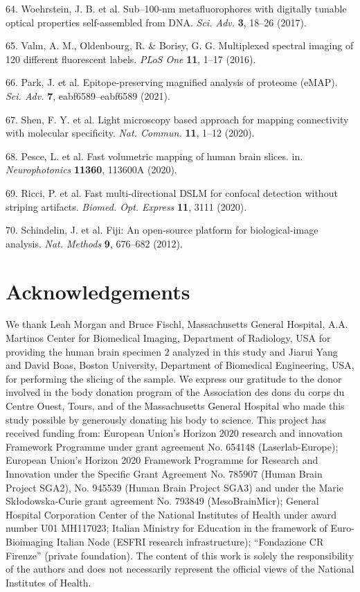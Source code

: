 \documentclass{article}
\begin{document}
\begin{hangpars}
64. Woehrstein, J. B. et al. Sub–100-nm metafluorophores with digitally tunable optical properties self-assembled from DNA. \emph{Sci. Adv.} \textbf{3}, 18–26 (2017).

65. Valm, A. M., Oldenbourg, R. \& Borisy, G. G. Multiplexed spectral imaging of 120 different fluorescent labels. \emph{PLoS One} \textbf{11}, 1–17 (2016).

66. Park, J. et al. Epitope-preserving magnified analysis of proteome (eMAP). \emph{Sci. Adv.} \textbf{7}, eabf6589–eabf6589 (2021).

67. Shen, F. Y. et al. Light microscopy based approach for mapping connectivity with molecular specificity. \emph{Nat. Commun.} \textbf{11}, 1–12 (2020).

68. Pesce, L. et al. Fast volumetric mapping of human brain slices. in. \emph{Neurophotonics} \textbf{11360}, 113600A (2020).

69. Ricci, P. et al. Fast multi-directional DSLM for confocal detection without striping artifacts. \emph{Biomed. Opt. Express} \textbf{11}, 3111 (2020).

70. Schindelin, J. et al. Fiji: An open-source platform for biological-image analysis. \emph{Nat. Methods} \textbf{9}, 676–682 (2012).

\end{hangpars}
\section*{Acknowledgements}

We thank Leah Morgan and Bruce Fischl, Massachusetts General Hospital, A.A. Martinos Center for Biomedical Imaging, Department of Radiology, USA for providing the human brain specimen 2 analyzed in this study and Jiarui Yang and David Boas, Boston University, Department of Biomedical Engineering, USA, for performing the slicing of the sample. We express our gratitude to the donor involved in the body donation program of the Association des dons du corps du Centre Ouest, Tours, and of the Massachusetts General Hospital who made this study possible by generously donating his body to science. This project has received funding from: European Union’s Horizon 2020 research and innovation Framework Programme under grant agreement No. 654148 (Laserlab-Europe); European Union’s Horizon 2020 Framework Programme for Research and Innovation under the Specific Grant Agreement No. 785907 (Human Brain Project SGA2), No. 945539 (Human Brain Project SGA3) and under the Marie Skłodowska-Curie grant agreement No. 793849 (MesoBrainMicr); General Hospital Corporation Center of the National Institutes of Health under award number U01 MH117023; Italian Ministry for Education in the framework of Euro-Bioimaging Italian Node (ESFRI research infrastructure); “Fondazione CR Firenze” (private foundation). The content of this work is solely the responsibility of the authors and does not necessarily represent the official views of the National Institutes of Health.
\end{document}
